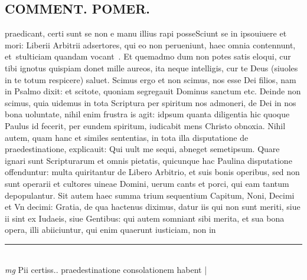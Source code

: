 \documentclass{article}
\begin{document}
\begin{pages}
\section*{COMMENT. POMER.  }\pstart praedicant, certi sunt se non e manu illius rapi posseSciunt se in ipsouiuere et mori: Liberii Arbitrii adsertores, qui eo non perueniunt, haec omnia contennunt, et stulticiam quandam vocant . Et quemadmo dum non potes satis eloqui, cur tibi ignotus quispiam donet mille aureos, ita neque intelligis, cur te Deus (siuoles in te totum respicere) saluet. Scimus ergo et non scimus, nos esse Dei filios, nam in Psalmo dixit: et scitote, quoniam segregauit Dominus sanctum etc. Deinde non scimus, quia uidemus in tota Scriptura per spiritum nos admoneri, de Dei in nos bona uoluntate, nihil enim frustra is agit: idpsum quanta diligentia hic quoque Paulus id fecerit, per eundem spiritum, iudicabit mens Christo obnoxia. Nihil autem, quam hanc et similes sententias, in tota illa disputatione de praedestinatione, explicauit: Qui uult me sequi, abneget semetipsum. Quare ignari sunt Scripturarum et omnis pietatis, quicunque hac Paulina disputatione offenduntur: multa quiritantur de Libero Arbitrio, et suis bonis operibus, sed non sunt operarii et cultores uineae Domini, uerum cants et porci, qui eam tantum depopulantur. Sit autem haec summa trium sequentium Capitum, Noni, Decimi et Vn decimi: Gratia, de qua hactenus diximus, datur iis qui non sunt meriti, siue ii sint ex Iudaeis, siue Gentibus: qui autem somniant sibi merita, et sua bona opera, illi abiiciuntur, qui enim quaerunt iusticiam, non in  \pend
\vspace{0.5cm}\noindent
\vspace{0.2cm}\rule{1cm}{0.2pt}\\ 
\hspace{0.2cm}\textit{mg}
\footnotesize Pii certiss.. praedestinatione consolationem habent 
\normalsize| 

\end{pages}
\end{document}
